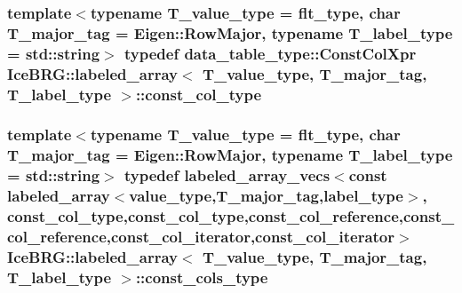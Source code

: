 \subsubsection[{const\+\_\+col\+\_\+type}]{\setlength{\rightskip}{0pt plus 5cm}template$<$typename T\+\_\+value\+\_\+type = flt\+\_\+type, char T\+\_\+major\+\_\+tag = Eigen\+::\+Row\+Major, typename T\+\_\+label\+\_\+type = std\+::string$>$ typedef data\+\_\+table\+\_\+type\+::\+Const\+Col\+Xpr {\bf Ice\+B\+R\+G\+::labeled\+\_\+array}$<$ T\+\_\+value\+\_\+type, T\+\_\+major\+\_\+tag, T\+\_\+label\+\_\+type $>$\+::{\bf const\+\_\+col\+\_\+type}}\label{classIceBRG_1_1labeled__array_aeba72c01006c312aedb340192a56901a}
\hypertarget{classIceBRG_1_1labeled__array_a69553829b7e85c125b24e1e72dcc5491}{}
\subsubsection[{const\+\_\+cols\+\_\+type}]{\setlength{\rightskip}{0pt plus 5cm}template$<$typename T\+\_\+value\+\_\+type = flt\+\_\+type, char T\+\_\+major\+\_\+tag = Eigen\+::\+Row\+Major, typename T\+\_\+label\+\_\+type = std\+::string$>$ typedef {\bf labeled\+\_\+array\+\_\+vecs}$<$const {\bf labeled\+\_\+array}$<${\bf value\+\_\+type},T\+\_\+major\+\_\+tag,{\bf label\+\_\+type}$>$, {\bf const\+\_\+col\+\_\+type},{\bf const\+\_\+col\+\_\+type},{\bf const\+\_\+col\+\_\+reference},{\bf const\+\_\+col\+\_\+reference},{\bf const\+\_\+col\+\_\+iterator},{\bf const\+\_\+col\+\_\+iterator}$>$ {\bf Ice\+B\+R\+G\+::labeled\+\_\+array}$<$ T\+\_\+value\+\_\+type, T\+\_\+major\+\_\+tag, T\+\_\+label\+\_\+type $>$\+::{\bf const\+\_\+cols\+\_\+type}}\label{classIceBRG_1_1labeled__array_a69553829b7e85c125b24e1e72dcc5491}
\hypertarget{classIceBRG_1_1labeled__array_a004378b6978779cae2c375a3a83001a2}{}

